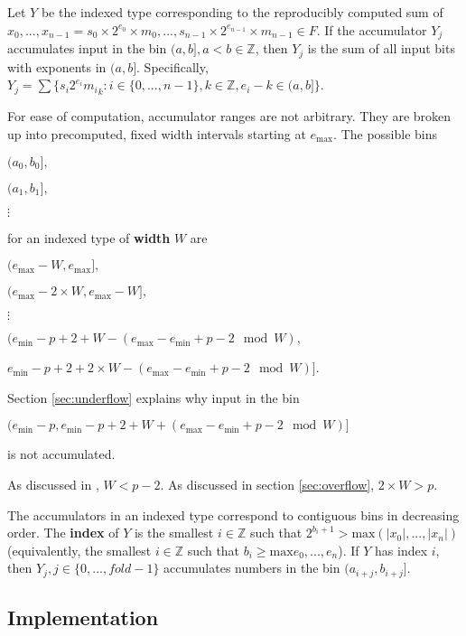 \documentclass[12pt]{article}
\providecommand{\Z}{\ensuremath{\mathbb{Z}}}
\providecommand{\min}{\ensuremath{\text{min}}}
\providecommand{\max}{\ensuremath{\text{max}}}
\theoremstyle{plain}
\begin{document}
    Let $Y$ be the indexed type corresponding to the reproducibly computed sum of $x_0, ..., x_{n - 1} = s_0 \times 2^{e_0} \times m_0, ..., s_{n - 1} \times 2^{e_{n - 1}} \times m_{n - 1} \in F$.
    If the accumulator $Y_j$ accumulates input in the bin $(a, b], a < b \in \Z$, then $Y_j$ is the sum of all input bits with exponents in $(a, b]$. Specifically, $Y_j = \sum \{s_i2^{e_i}{m_i}_k: i \in \{0, ..., n - 1\}, k \in \Z, e_i - k \in (a, b]\}$.

    For ease of computation, accumulator ranges are not arbitrary. They are broken up into precomputed, fixed width intervals starting at $e_{\max}$. The possible bins

    $(a_0, b_0],$

    $(a_1, b_1],$

    $\vdots$

    for an indexed type of \textbf{width} $W$ are

    $(e_{\max} - W, e_{\max}],$

    $(e_{\max} - 2\times W, e_{\max} - W],$

    $\vdots$

    $(e_{\min} - p + 2 + W - (e_{\max} - e_{\min} + p - 2 \mod W),$

    \indent \indent $e_{\min} - p + 2 + 2 \times W - (e_{\max} - e_{\min} + p - 2 \mod W)]$.

    Section \ref{sec:underflow} explains why input in the bin

    $(e_{\min} - p, e_{\min} - p + 2 + W + (e_{\max} - e_{\min} + p - 2 \mod W)]$

    is not accumulated.

    As discussed in \cite{repsum}, $W < p - 2$. As discussed in section \ref{sec:overflow}, $2\times W > p$.

    The accumulators in an indexed type correspond to contiguous bins in decreasing order. The \textbf{index} of $Y$ is the smallest $i \in \Z$ such that $2^{b_i + 1} > \max(|x_0|, ..., |x_n|)$ (equivalently, the smallest $i \in \Z$ such that $b_i \geq \max{e_0, ..., e_n}$). If $Y$ has index $i$, then $Y_j, j \in \{0, ..., fold - 1\}$ accumulates numbers in the bin $(a_{i + j}, b_{i + j}]$.

  \subsection{Implementation}
\end{document}
